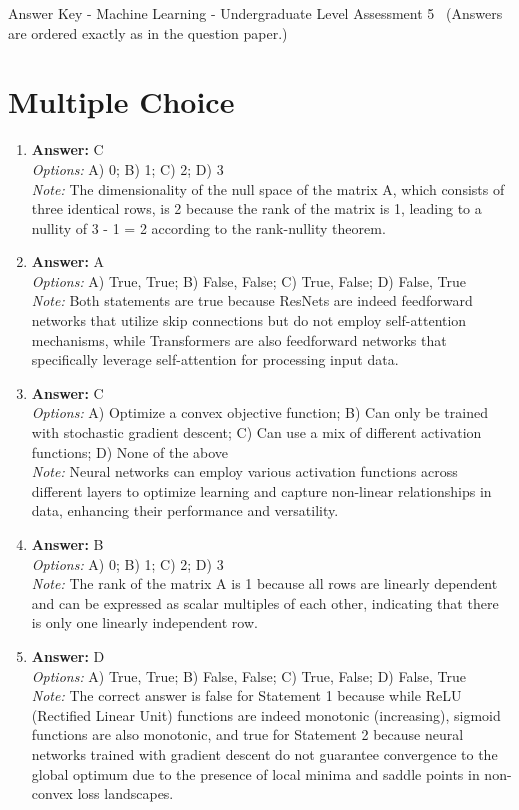 \documentclass[12pt]{article}
\begin{document}
\begin{center}
Answer Key - Machine Learning - Undergraduate Level Assessment 5 \
\small (Answers are ordered exactly as in the question paper.)
\end{center}

\section*{Multiple Choice}
\begin{enumerate}[label=\arabic*.]
\item \textbf{Answer:} C
\\ \textit{Options:} A) 0; B) 1; C) 2; D) 3
\\ \textit{Note:} The dimensionality of the null space of the matrix A, which consists of three identical rows, is 2 because the rank of the matrix is 1, leading to a nullity of 3 - 1 = 2 according to the rank-nullity theorem.
\item \textbf{Answer:} A
\\ \textit{Options:} A) True, True; B) False, False; C) True, False; D) False, True
\\ \textit{Note:} Both statements are true because ResNets are indeed feedforward networks that utilize skip connections but do not employ self-attention mechanisms, while Transformers are also feedforward networks that specifically leverage self-attention for processing input data.
\item \textbf{Answer:} C
\\ \textit{Options:} A) Optimize a convex objective function; B) Can only be trained with stochastic gradient descent; C) Can use a mix of different activation functions; D) None of the above
\\ \textit{Note:} Neural networks can employ various activation functions across different layers to optimize learning and capture non-linear relationships in data, enhancing their performance and versatility.
\item \textbf{Answer:} B
\\ \textit{Options:} A) 0; B) 1; C) 2; D) 3
\\ \textit{Note:} The rank of the matrix A is 1 because all rows are linearly dependent and can be expressed as scalar multiples of each other, indicating that there is only one linearly independent row.
\item \textbf{Answer:} D
\\ \textit{Options:} A) True, True; B) False, False; C) True, False; D) False, True
\\ \textit{Note:} The correct answer is false for Statement 1 because while ReLU (Rectified Linear Unit) functions are indeed monotonic (increasing), sigmoid functions are also monotonic, and true for Statement 2 because neural networks trained with gradient descent do not guarantee convergence to the global optimum due to the presence of local minima and saddle points in non-convex loss landscapes.
\end{enumerate}
\end{document}
